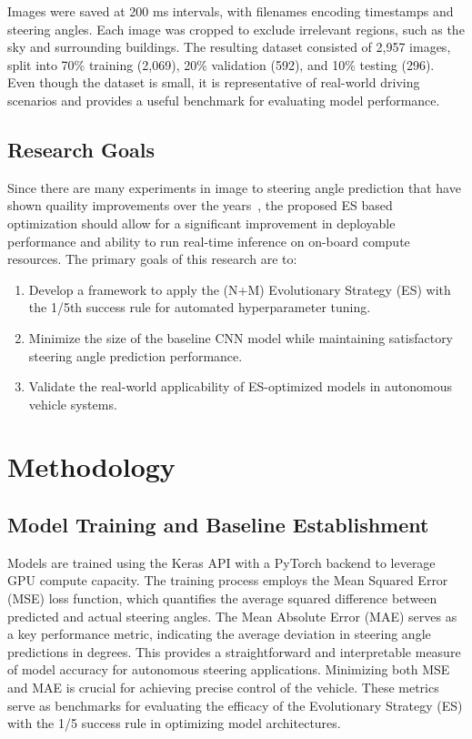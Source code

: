 \documentclass[conference]{IEEEtran}
\begin{document}
Images were saved at 200 ms intervals, with filenames encoding timestamps and steering angles. Each image was cropped to exclude irrelevant regions, such as the sky and surrounding buildings. The resulting dataset consisted of 2,957 images, split into 70\% training (2,069), 20\% validation (592), and 10\% testing (296). Even though the dataset is small, it is representative of real-world driving scenarios and provides a useful benchmark for evaluating model performance.

\subsection{Research Goals}

Since there are many experiments in image to steering angle prediction that have shown quaility improvements over the years~\cite{PilotNET_application,lane_detection_good_results_zigzag,CNN_can_self_drive}, the proposed ES based optimization should allow for a significant improvement in deployable performance and ability to run real-time inference on on-board compute resources. The primary goals of this research are to:

\begin{enumerate}
    \item Develop a framework to apply the (N+M) Evolutionary Strategy (ES) with the 1/5th success rule for automated hyperparameter tuning.
    \item Minimize the size of the baseline CNN model while maintaining satisfactory steering angle prediction performance.
    \item Validate the real-world applicability of ES-optimized models in autonomous vehicle systems.
\end{enumerate}

\section{Methodology}

\subsection{Model Training and Baseline Establishment}

Models are trained using the Keras API with a PyTorch backend to leverage GPU compute capacity. The training process employs the Mean Squared Error (MSE) loss function, which quantifies the average squared difference between predicted and actual steering angles. The Mean Absolute Error (MAE) serves as a key performance metric, indicating the average deviation in steering angle predictions in degrees. This provides a straightforward and interpretable measure of model accuracy for autonomous steering applications. Minimizing both MSE and MAE is crucial for achieving precise control of the vehicle. These metrics serve as benchmarks for evaluating the efficacy of the Evolutionary Strategy (ES) with the 1/5 success rule in optimizing model architectures.
\end{document}
